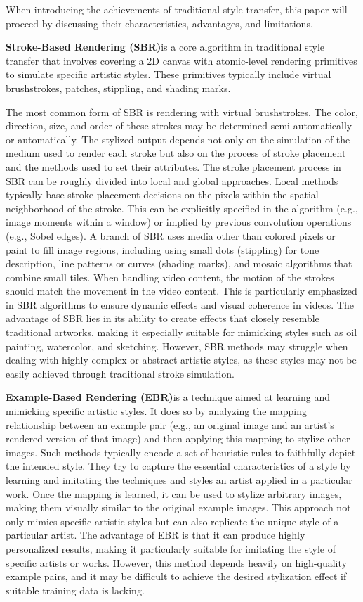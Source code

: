 \documentclass[preprint,12pt]{elsarticle}
\begin{document}
When introducing the achievements of traditional style transfer, this paper will proceed by discussing their characteristics, advantages, and limitations.

\textbf{Stroke-Based Rendering (SBR)}is a core algorithm in traditional style transfer that involves covering a 2D canvas with atomic-level rendering primitives to simulate specific artistic styles. These primitives typically include virtual brushstrokes, patches, stippling, and shading marks.

The most common form of SBR is rendering with virtual brushstrokes. The color, direction, size, and order of these strokes may be determined semi-automatically or automatically. The stylized output depends not only on the simulation of the medium used to render each stroke but also on the process of stroke placement and the methods used to set their attributes. The stroke placement process in SBR can be roughly divided into local and global approaches. Local methods typically base stroke placement decisions on the pixels within the spatial neighborhood of the stroke. This can be explicitly specified in the algorithm (e.g., image moments within a window) or implied by previous convolution operations (e.g., Sobel edges). A branch of SBR uses media other than colored pixels or paint to fill image regions, including using small dots (stippling) for tone description, line patterns or curves (shading marks), and mosaic algorithms that combine small tiles. When handling video content, the motion of the strokes should match the movement in the video content. This is particularly emphasized in SBR algorithms to ensure dynamic effects and visual coherence in videos. The advantage of SBR lies in its ability to create effects that closely resemble traditional artworks, making it especially suitable for mimicking styles such as oil painting, watercolor, and sketching. However, SBR methods may struggle when dealing with highly complex or abstract artistic styles, as these styles may not be easily achieved through traditional stroke simulation.


\textbf{Example-Based Rendering (EBR)}is a technique aimed at learning and mimicking specific artistic styles. It does so by analyzing the mapping relationship between an example pair (e.g., an original image and an artist's rendered version of that image) and then applying this mapping to stylize other images. Such methods typically encode a set of heuristic rules to faithfully depict the intended style. They try to capture the essential characteristics of a style by learning and imitating the techniques and styles an artist applied in a particular work. Once the mapping is learned, it can be used to stylize arbitrary images, making them visually similar to the original example images. This approach not only mimics specific artistic styles but can also replicate the unique style of a particular artist. The advantage of EBR is that it can produce highly personalized results, making it particularly suitable for imitating the style of specific artists or works. However, this method depends heavily on high-quality example pairs, and it may be difficult to achieve the desired stylization effect if suitable training data is lacking.
\end{document}
